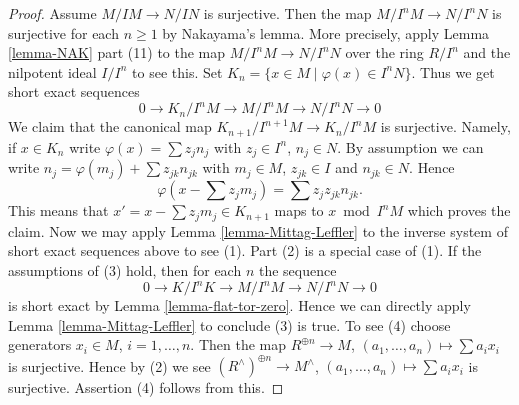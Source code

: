 \documentclass[10pt,a4paper]{amsart}
\theoremstyle{plain}
\theoremstyle{definition}
\theoremstyle{remark}
\numberwithin{equation}{subsection}
\begin{document}
\begin{proof}
Assume $M/IM \to N/IN$ is surjective. Then the map $M/I^nM \to N/I^nN$
is surjective for each $n \geq 1$ by Nakayama's lemma. More precisely,
apply Lemma \ref{lemma-NAK} part (11) to the
map $M/I^nM \to N/I^nN$ over the ring $R/I^n$ and the nilpotent
ideal $I/I^n$ to see this. Set $K_n = \{x \in M \mid \varphi(x) \in I^nN\}$.
Thus we get short exact sequences
$$
0 \to K_n/I^nM \to M/I^nM \to N/I^nN \to 0
$$
We claim that the canonical map $K_{n + 1}/I^{n + 1}M \to K_n/I^nM$
is surjective. Namely, if $x \in K_n$ write
$\varphi(x) = \sum z_j n_j$ with $z_j \in I^n$, $n_j \in N$.
By assumption we can write $n_j = \varphi(m_j) + \sum z_{jk}n_{jk}$
with $m_j \in M$, $z_{jk} \in I$ and $n_{jk} \in N$. Hence
$$
\varphi(x - \sum z_j m_j) = \sum z_jz_{jk} n_{jk}.
$$
This means that $x' = x - \sum z_j m_j \in K_{n + 1}$ maps
to $x \bmod I^nM$ which proves the claim. Now we may apply
Lemma \ref{lemma-Mittag-Leffler}
to the inverse system of short exact sequences above to see (1).
Part (2) is a special case of (1).
If the assumptions of (3) hold, then for each $n$ the sequence
$$
0 \to K/I^nK \to M/I^nM \to N/I^nN \to 0
$$
is short exact by
Lemma \ref{lemma-flat-tor-zero}.
Hence we can directly apply
Lemma \ref{lemma-Mittag-Leffler}
to conclude (3) is true.
To see (4) choose generators $x_i \in M$, $i = 1, \ldots, n$.
Then the map $R^{\oplus n} \to M$, $(a_1, \ldots, a_n) \mapsto \sum a_ix_i$
is surjective. Hence by (2) we see
$(R^\wedge)^{\oplus n} \to M^\wedge$, $(a_1, \ldots, a_n) \mapsto \sum a_ix_i$
is surjective. Assertion (4) follows from this.
\end{proof}
\end{document}

